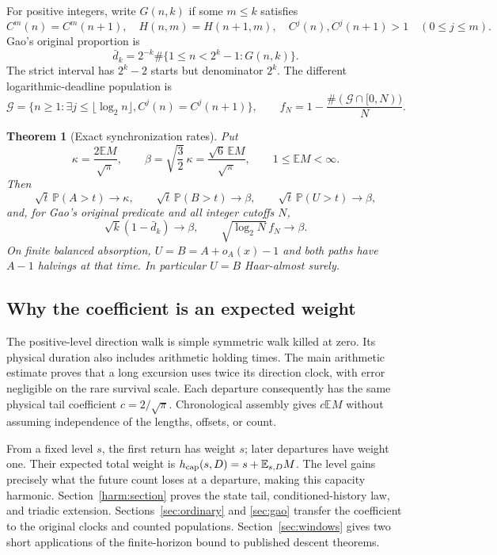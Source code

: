 \documentclass[11pt]{amsart}
\newtheorem{maintheorem}{Theorem}
\theoremstyle{definition}
\theoremstyle{remark}
\newcommand{\E}{\mathbb E}
\newcommand{\PP}{\mathbb P}
\begin{document}
For positive integers, write $G(n,k)$ if some $m\le k$ satisfies
\[
C^m(n)=C^m(n+1),\quad H(n,m)=H(n+1,m),\quad
C^j(n),C^j(n+1)>1\quad(0\le j\le m).
\]
Gao's original proportion is
\[
\bar d_k=2^{-k}\#\{1\le n<2^k-1:G(n,k)\}.
\]
The strict interval has $2^k-2$ starts but denominator $2^k$.
The different logarithmic-deadline population is
\[
\mathcal G=\{n\ge1:\exists j\le\lfloor\log_2n\rfloor,
 C^j(n)=C^j(n+1)\},\qquad
f_N=1-\frac{\#(\mathcal G\cap[0,N))}{N}.
\]

\begin{maintheorem}[Exact synchronization rates]
\label{thm:exact}\label{thm:gao-sharp}\label{thm:deadline}
Put
\[
\kappa=\frac{2\E M}{\sqrt\pi},\qquad
\beta=\sqrt{\frac32}\,\kappa=\frac{\sqrt6\,\E M}{\sqrt\pi},
\qquad 1\le\E M<\infty.
\]
Then
\[
\sqrt t\,\PP(A>t)\to\kappa,\qquad
\sqrt t\,\PP(B>t)\to\beta,\qquad
\sqrt t\,\PP(U>t)\to\beta,
\]
and, for Gao's original predicate and all integer cutoffs $N$,
\[
\sqrt k(1-\bar d_k)\to\beta,\qquad
\sqrt{\log_2N}\,f_N\to\beta.
\]
On finite balanced absorption, $U=B=A+o_A(x)-1$ and both paths have
$A-1$ halvings at that time. In particular $U=B$ Haar-almost surely.
\end{maintheorem}

\subsection*{Why the coefficient is an expected weight}
The positive-level direction walk is simple symmetric walk killed at
zero. Its physical duration also includes arithmetic holding times.
The main arithmetic estimate proves that a long excursion uses twice
its direction clock, with error negligible on the rare survival scale.
Each departure consequently has the same physical tail coefficient
$c=2/\sqrt\pi$. Chronological assembly gives $c\E M$ without assuming
independence of the lengths, offsets, or count.

From a fixed level $s$, the first return has weight $s$; later departures
have weight one. Their expected total weight is
$h_{\rm cap}(s,D)=s+\E_{s,D}M$. The level gains precisely what the
future count loses at a departure, making this capacity harmonic.
Section~\ref{harm:section} proves the state tail, conditioned-history
law, and triadic extension. Sections~\ref{sec:ordinary} and
\ref{sec:gao} transfer the coefficient to the original clocks and
counted populations. Section~\ref{sec:windows} gives two short
applications of the finite-horizon bound to published descent theorems.
\end{document}
